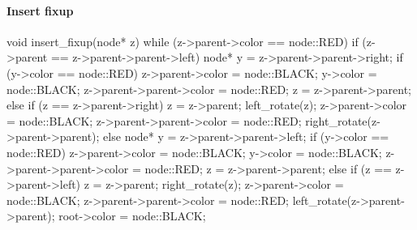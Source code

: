 \documentclass{report}
\begin{document}
\paragraph{Insert fixup}
\bigbreak \noindent 
\begin{cppcode}
    void insert_fixup(node* z) {
        while (z->parent->color == node::RED) {
            if (z->parent == z->parent->parent->left) {
                node* y = z->parent->parent->right;
                if (y->color == node::RED) {
                    z->parent->color = node::BLACK;
                    y->color = node::BLACK;
                    z->parent->parent->color = node::RED;
                    z = z->parent->parent;
                } else {
                    if (z == z->parent->right) {
                        z = z->parent;
                        left_rotate(z);
                    }
                    z->parent->color = node::BLACK;
                    z->parent->parent->color = node::RED;
                    right_rotate(z->parent->parent);
                }
            } else {
                node* y = z->parent->parent->left;
                if (y->color == node::RED) {
                    z->parent->color = node::BLACK;
                    y->color = node::BLACK;
                    z->parent->parent->color = node::RED;
                    z = z->parent->parent;
                } else {
                    if (z == z->parent->left) {
                        z = z->parent;
                        right_rotate(z);
                    }
                    z->parent->color = node::BLACK;
                    z->parent->parent->color = node::RED;
                    left_rotate(z->parent->parent);
                }
            }
        }
        root->color = node::BLACK;
    }
\end{cppcode}
\end{document}
